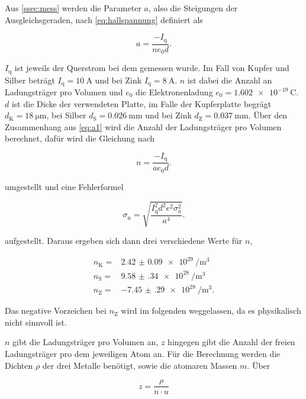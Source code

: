 Aus \autoref{ssec:mess} werden die Parameter $a$, also die Steigungen der Ausgleichsgeraden, nach \autoref{eq:hallspannung} definiert als

\begin{equation}
    a = \frac{-I_\text{q}}{n e_0 d}.
    \label{eq:a1}
\end{equation}

$I_\text{q}$ ist jeweils der Querstrom bei dem gemessen wurde.
Im Fall von Kupfer und Silber beträgt $I_\text{q} = \SI{10}{\ampere}$ und bei Zink $I_\text{q} = \SI{8}{\ampere}$.
$n$ ist dabei die Anzahl an Ladungsträger pro Volumen und $e_0$ die Elektronenladung $e_0 = \SI{1.602e-19}{\coulomb}$. 
$d$ ist die Dicke der verwendeten Platte, im Falle der Kupferplatte begrägt $d_\text{K} = \SI{18}{\micro\meter}$, bei Silber $d_\text{S} = \SI{0.026}{\milli\meter}$ und bei Zink $d_\text{Z} = \SI{0.037}{\milli\meter}$.
Über den Zusammenhang aus \autoref{eq:a1} wird die Anzahl der Ladungsträger pro Volumen berechnet, dafür wird die Gleichung nach 

\begin{equation}
    n = \frac{-I_\text{q}}{a e_0 d}.
    \label{eq:n}
\end{equation}

umgestellt und eine Fehlerformel 

\begin{equation}
    \sigma _\text{n} = \sqrt{\frac {I_\text{q}^{2} d^{2} e^{2} \sigma_{a}^{2} }{a^{4}}}.
    \label{eq:n_fehler}
\end{equation}

aufgestellt.
Daraus ergeben sich dann drei verschiedene Werte für $n$,

\begin{align}
    n_\text{K} =& \SI{2.42(9)e29}{\per\cubic\meter} \\
    n_\text{S} =& \SI{9.58(34)e28}{\per\cubic\meter} \\
    n_\text{Z} =& \SI{-7.45(29)e28}{\per\cubic\meter}.
    \label{eq:n1}
\end{align}

Das negative Vorzeichen bei $n_\text{Z}$ wird im folgenden weggelassen, da es physikalisch nicht sinnvoll ist.

$n$ gibt die Ladungsträger pro Volumen an, $z$ hingegen gibt die Anzahl der freien Ladungsträger pro dem jeweiligen Atom an. 
Für die Berechnung werden die Dichten $\rho$ der drei Metalle benötigt, sowie die atomaren Massen $m$.
Über 

\begin{equation}
    z = \frac{\rho}{n \cdot u}
    \label{eq:nproatom}
\end{equation}

